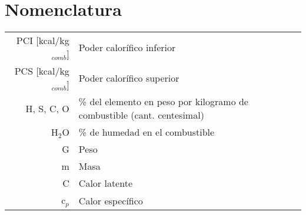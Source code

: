 \documentclass[11pt,a4paper]{article}
\begin{document}
	\pagestyle{pieyencabezado}
	
	\section*{Nomenclatura}
	\begin{tabular}{r l}
		PCI [kcal/kg$_{comb}$] & Poder calorífico inferior \\
		PCS [kcal/kg$_{comb}$] & Poder calorífico superior \\
		H, S, C, O & \% del elemento en peso por kilogramo de combustible (cant. centesimal)\\
		H$_2$O & \% de humedad en el combustible \\
		G & Peso\\
		m & Masa\\
		C & Calor latente\\
		c$_p$ & Calor específico
	\end{tabular}

	
\end{document}
